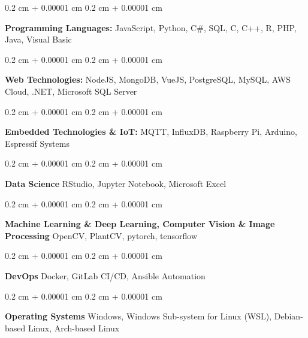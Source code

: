 \documentclass[10pt, letterpaper]{article}
\newenvironment{onecolentry}{
    \begin{adjustwidth}{
        0.2 cm + 0.00001 cm
    }{
        0.2 cm + 0.00001 cm
    }
}{
    \end{adjustwidth}
} %
\begin{document}
        
        \begin{onecolentry}
            \textbf{Programming Languages:} JavaScript, Python, C\#, SQL, C, C++, R, PHP, Java, Visual Basic
        \end{onecolentry}

        \vspace{0.2 cm}

        \begin{onecolentry}
            \textbf{Web Technologies:} NodeJS, MongoDB, VueJS, PostgreSQL, MySQL, AWS Cloud, .NET, Microsoft SQL Server
        \end{onecolentry}

        \vspace{0.2 cm}

        \begin{onecolentry}
            \textbf{Embedded Technologies \& IoT:} MQTT, InfluxDB, Raspberry Pi, Arduino, Espressif Systems
        \end{onecolentry}

        \vspace{0.2 cm}

        \begin{onecolentry}
            \textbf{Data Science} RStudio, Jupyter Notebook, Microsoft Excel
        \end{onecolentry}

        \vspace{0.2 cm}

        \begin{onecolentry}
            \textbf{Machine Learning \& Deep Learning, Computer Vision \& Image Processing} OpenCV, PlantCV, pytorch, tensorflow 
        \end{onecolentry}

        \vspace{0.2 cm}

        \begin{onecolentry}
            \textbf{DevOps} Docker, GitLab CI/CD, Ansible Automation
        \end{onecolentry}

        \vspace{0.2 cm}

        \begin{onecolentry}
            \textbf{Operating Systems} Windows, Windows Sub-system for Linux (WSL), Debian-based Linux, Arch-based Linux
        \end{onecolentry}

        \vspace{0.2 cm}
\end{document}

